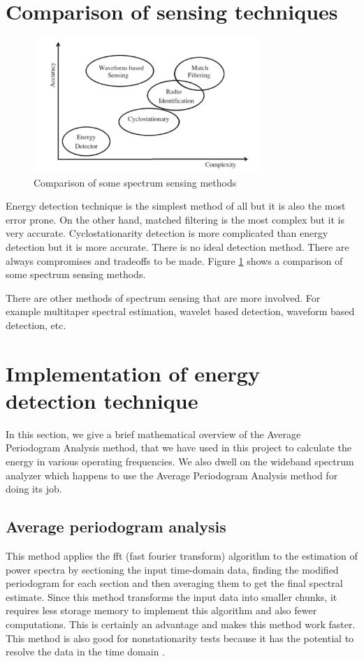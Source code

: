 \section{Comparison of sensing techniques}

\begin{figure}
\centering
\includegraphics[width=0.77\textwidth]{../images/compareSensing}
\caption[Comparison of sensing methods]{Comparison of some spectrum sensing 
methods {\cite{kranthi13}}}
\label{compareSensing}
\end{figure}

Energy detection technique is the simplest method of all but it is also the 
most error prone. On the other hand, matched filtering is the most complex but 
it is very accurate. Cyclostationarity detection is more complicated than 
energy detection but it is more accurate. There is no ideal detection method.
There are always compromises and tradeoffs to be made. Figure 
\ref{compareSensing} shows a comparison of some spectrum sensing methods.

There are other methods of spectrum sensing that are more involved. For
example multitaper spectral estimation, wavelet based detection, waveform
based detection, etc.


\section{Implementation of energy detection technique}

In this section, we give a brief mathematical overview of the Average 
Periodogram Analysis method, that we have used in this project to calculate 
the energy in various operating frequencies. We also dwell on the wideband 
spectrum analyzer which happens to use the Average Periodogram Analysis 
method for doing its job.

\subsection{Average periodogram analysis}
This method applies the \gls{fft}  (fast fourier transform) algorithm to the 
estimation of power spectra by sectioning the input time-domain data, finding
the modified periodogram for each section and then averaging them to get the
final spectral estimate. Since this method transforms the input data into 
smaller chunks, it requires less storage memory to implement this algorithm 
and also fewer computations. This is certainly an advantage and makes this 
method work faster. This method is also good for nonstationarity tests because
it has the potential to resolve the data in the time domain \cite{welch67}.

